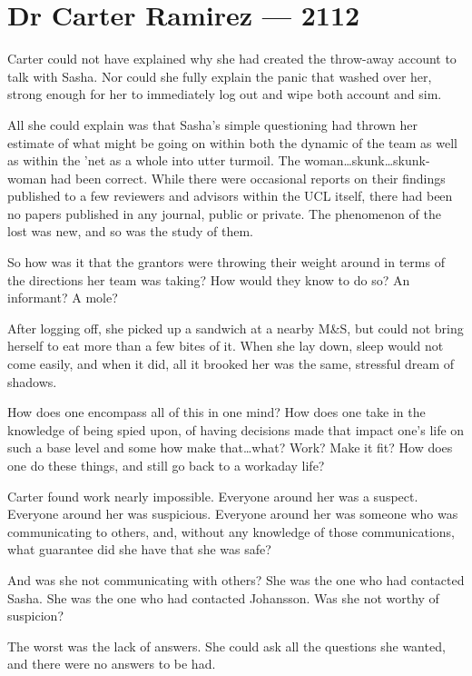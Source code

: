 \hypertarget{dr-carter-ramirez-2112}{%
\chapter*{Dr Carter Ramirez — 2112}\label{dr-carter-ramirez-2112}}

Carter could not have explained why she had created the throw-away account to talk with Sasha. Nor could she fully explain the panic that washed over her, strong enough for her to immediately log out and wipe both account and sim.

All she could explain was that Sasha's simple questioning had thrown her estimate of what might be going on within both the dynamic of the team as well as within the 'net as a whole into utter turmoil. The woman\ldots{}skunk\ldots{}skunk-woman had been correct. While there were occasional reports on their findings published to a few reviewers and advisors within the UCL itself, there had been no papers published in any journal, public or private. The phenomenon of the lost was new, and so was the study of them.

So how was it that the grantors were throwing their weight around in terms of the directions her team was taking? How would they know to do so? An informant? A mole?

After logging off, she picked up a sandwich at a nearby M\&S, but could not bring herself to eat more than a few bites of it. When she lay down, sleep would not come easily, and when it did, all it brooked her was the same, stressful dream of shadows.

How does one encompass all of this in one mind? How does one take in the knowledge of being spied upon, of having decisions made that impact one's life on such a base level and some how make that\ldots{}what? Work? Make it fit? How does one do these things, and still go back to a workaday life?

Carter found work nearly impossible. Everyone around her was a suspect. Everyone around her was suspicious. Everyone around her was someone who was communicating to others, and, without any knowledge of those communications, what guarantee did she have that she was safe?

And was she not communicating with others? She was the one who had contacted Sasha. She was the one who had contacted Johansson. Was she not worthy of suspicion?

The worst was the lack of answers. She could ask all the questions she wanted, and there were no answers to be had.

